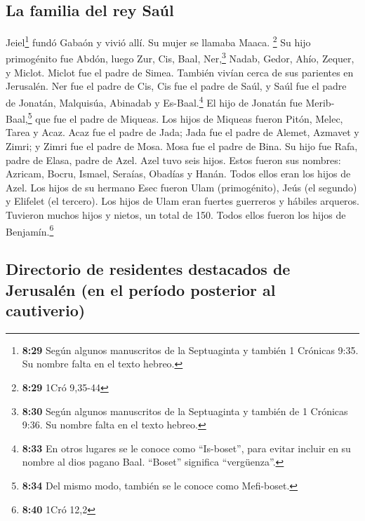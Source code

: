 \hypertarget{la-familia-del-rey-sauxfal}{%
\subsection{La familia del rey Saúl}\label{la-familia-del-rey-sauxfal}}

 Jeiel\footnote{\textbf{8:29} Según algunos manuscritos
  de la Septuaginta y también 1 Crónicas 9:35. Su nombre falta en el
  texto hebreo.} fundó Gabaón y vivió allí. Su mujer se llamaba Maaca.
\footnote{\textbf{8:29} 1Cró 9,35-44}  Su hijo
primogénito fue Abdón, luego Zur, Cis, Baal, Ner,\footnote{\textbf{8:30}
  Según algunos manuscritos de la Septuaginta y también de 1 Crónicas
  9:36. Su nombre falta en el texto hebreo.} Nadab, 
Gedor, Ahío, Zequer,  y Miclot. Miclot fue el padre de
Simea. También vivían cerca de sus parientes en Jerusalén.
 Ner fue el padre de Cis, Cis fue el padre de Saúl, y
Saúl fue el padre de Jonatán, Malquisúa, Abinadab y Es-Baal.\footnote{\textbf{8:33}
  En otros lugares se le conoce como ``Is-boset'', para evitar incluir
  en su nombre al dios pagano Baal. ``Boset'' significa ``vergüenza''.}
 El hijo de Jonatán fue Merib-Baal,\footnote{\textbf{8:34}
  Del mismo modo, también se le conoce como Mefi-boset.} que fue el
padre de Miqueas.  Los hijos de Miqueas fueron Pitón,
Melec, Tarea y Acaz.  Acaz fue el padre de Jada; Jada fue
el padre de Alemet, Azmavet y Zimri; y Zimri fue el padre de Mosa.
 Mosa fue el padre de Bina. Su hijo fue Rafa, padre de
Elasa, padre de Azel.  Azel tuvo seis hijos. Estos fueron
sus nombres: Azricam, Bocru, Ismael, Seraías, Obadías y Hanán. Todos
ellos eran los hijos de Azel.  Los hijos de su hermano
Esec fueron Ulam (primogénito), Jeús (el segundo) y Elifelet (el
tercero).  Los hijos de Ulam eran fuertes guerreros y
hábiles arqueros. Tuvieron muchos hijos y nietos, un total de 150. Todos
ellos fueron los hijos de Benjamín.\footnote{\textbf{8:40} 1Cró 12,2}

\hypertarget{directorio-de-residentes-destacados-de-jerusaluxe9n-en-el-peruxedodo-posterior-al-cautiverio}{%
\subsection{Directorio de residentes destacados de Jerusalén (en el
período posterior al
cautiverio)}\label{directorio-de-residentes-destacados-de-jerusaluxe9n-en-el-peruxedodo-posterior-al-cautiverio}}

